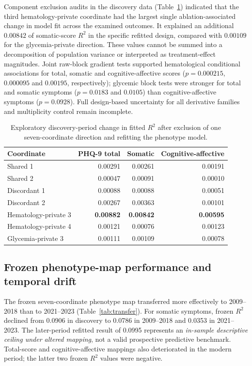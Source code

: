 \documentclass[11pt,a4paper]{article}
\newcommand{\Rtwo}{R^{2}}
\begin{document}
Component exclusion audits in the discovery data (Table~\ref{tab:ablations}) indicated that the third hematology-private coordinate had the largest single ablation-associated change in model fit across the examined outcomes. It explained an additional $0.00842$ of somatic-score $\Rtwo$ in the specific refitted design, compared with $0.00109$ for the glycemia-private direction. These values cannot be summed into a decomposition of population variance or interpreted as treatment-effect magnitudes. Joint raw-block gradient tests supported hematological conditional associations for total, somatic and cognitive-affective scores ($p=0.000215$, $0.000095$ and $0.00195$, respectively); glycemic block tests were stronger for total and somatic symptoms ($p=0.0183$ and $0.0105$) than cognitive-affective symptoms ($p=0.0928$). Full design-based uncertainty for all derivative families and multiplicity control remain incomplete.

\begin{table}[htbp]\centering\small
\caption{Exploratory discovery-period change in fitted $\Rtwo$ after exclusion of one seven-coordinate direction and refitting the phenotype model.}
\label{tab:ablations}
\begin{tabular}{lrrr}\toprule
Coordinate & PHQ-9 total & Somatic & Cognitive-affective\\\midrule
Shared 1 & 0.00291 & 0.00261 & 0.00191\\
Shared 2 & 0.00047 & 0.00091 & 0.00010\\
Discordant 1 & 0.00088 & 0.00088 & 0.00051\\
Discordant 2 & 0.00267 & 0.00363 & 0.00101\\
Hematology-private 3 & \textbf{0.00882} & \textbf{0.00842} & \textbf{0.00595}\\
Hematology-private 4 & 0.00121 & 0.00076 & 0.00123\\
Glycemia-private 3 & 0.00111 & 0.00109 & 0.00078\\\bottomrule
\end{tabular}
\end{table}

\subsection{Frozen phenotype-map performance and temporal drift}
The frozen seven-coordinate phenotype map transferred more effectively to 2009--2018 than to 2021--2023 (Table~\ref{tab:transfer}). For somatic symptoms, frozen $\Rtwo$ declined from 0.0906 in discovery to 0.0786 in 2009--2018 and 0.0353 in 2021--2023. The later-period refitted result of 0.0995 represents an \emph{in-sample descriptive ceiling under altered mapping}, not a valid prospective predictive benchmark. Total-score and cognitive-affective mappings also deteriorated in the modern period; the latter two frozen $\Rtwo$ values were negative.
\end{document}
